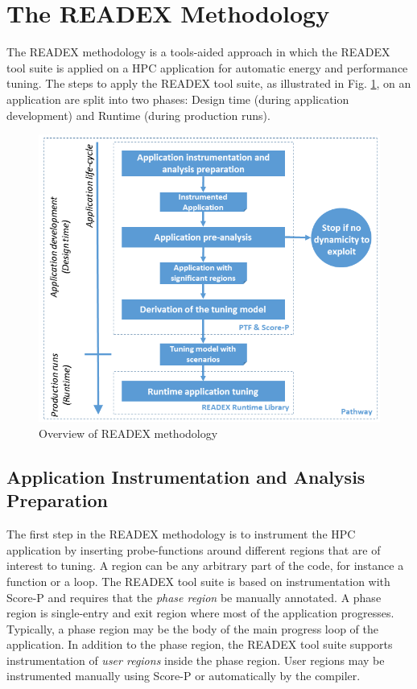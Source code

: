 \section{The READEX Methodology} \label{sec:methodology}

The READEX methodology is a tools-aided approach in which the READEX tool suite is applied on a HPC application for automatic energy and performance tuning. The steps to apply the READEX tool suite, as illustrated in Fig. \ref{fig:readex_methodology}, on an application are split into two phases: Design time (during application development) and Runtime (during production runs).

\begin{figure}[!t]
\centering
\includegraphics[width=.70\columnwidth]{figures/READEX_workflow.png}
\caption{Overview of READEX methodology}
\label{fig:readex_methodology}
\end{figure}

\subsection{Application Instrumentation and Analysis Preparation}
\label{sec:application_instrumentation}
The first step in the READEX methodology is to instrument the HPC application by inserting probe-functions around different regions that are of interest to tuning. A region can be any arbitrary part of the code, for instance a function or a loop. The READEX tool suite is based on instrumentation with Score-P and requires that the \textit{phase region} be manually annotated. A phase region is single-entry and exit region where most of the application progresses. Typically, a phase region may be the body of the main progress loop of the application. In addition to the phase region, the READEX tool suite supports instrumentation of \textit{user regions} inside the phase region. User regions may be instrumented manually using Score-P or automatically by the compiler.

